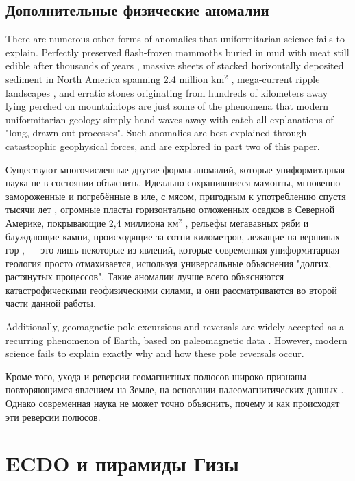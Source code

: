 \documentclass[10pt,twocolumn,letterpaper]{article}
\begin{document}
\subsection{Дополнительные физические аномалии}
There are numerous other forms of anomalies that uniformitarian science fails to explain. Perfectly preserved flash-frozen mammoths buried in mud with meat still edible after thousands of years \cite{17,18,19}, massive sheets of stacked horizontally deposited sediment in North America spanning 2.4 million km$^2$ \cite{21}, mega-current ripple landscapes \cite{22}, and erratic stones originating from hundreds of kilometers away lying perched on mountaintops \cite{23,26} are just some of the phenomena that modern uniformitarian geology simply hand-waves away with catch-all explanations of "long, drawn-out processes". Such anomalies are best explained through catastrophic geophysical forces, and are explored in part two of this paper.

Существуют многочисленные другие формы аномалий, которые униформитарная наука не в состоянии объяснить. Идеально сохранившиеся мамонты, мгновенно замороженные и погребённые в иле, с мясом, пригодным к употреблению спустя тысячи лет \cite{17,18,19}, огромные пласты горизонтально отложенных осадков в Северной Америке, покрывающие 2,4 миллиона км$^2$ \cite{21}, рельефы мегававных ряби \cite{22} и блуждающие камни, происходящие за сотни километров, лежащие на вершинах гор \cite{23,26}, — это лишь некоторые из явлений, которые современная униформитарная геология просто отмахивается, используя универсальные объяснения "долгих, растянутых процессов". Такие аномалии лучше всего объясняются катастрофическими геофизическими силами, и они рассматриваются во второй части данной работы.

Additionally, geomagnetic pole excursions and reversals are widely accepted as a recurring phenomenon of Earth, based on paleomagnetic data \cite{35,40,41}. However, modern science fails to explain exactly why and how these pole reversals occur.

Кроме того, ухода и реверсии геомагнитных полюсов широко признаны повторяющимся явлением на Земле, на основании палеомагнитических данных \cite{35,40,41}. Однако современная наука не может точно объяснить, почему и как происходят эти реверсии полюсов.

\section{ECDO и пирамиды Гизы}
\end{document}
